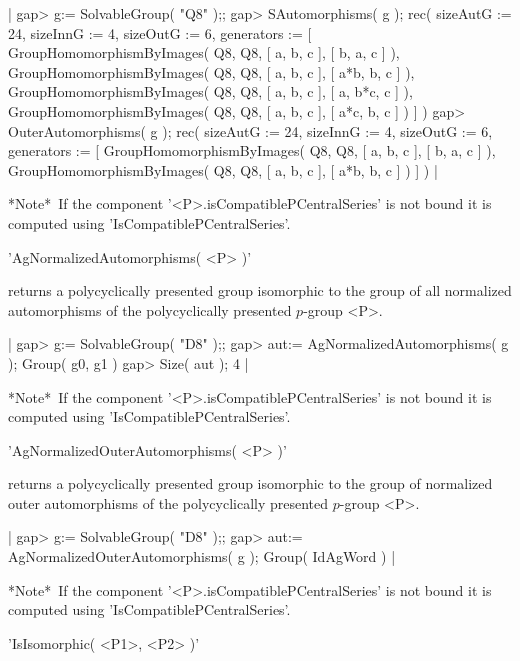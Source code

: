 |    gap> g:= SolvableGroup( "Q8" );;
    gap> SAutomorphisms( g );
    rec(
    sizeAutG := 24,
    sizeInnG := 4,
    sizeOutG := 6,
    generators := 
    [ GroupHomomorphismByImages( Q8, Q8, [ a, b, c ], [ b, a, c ] ), 
      GroupHomomorphismByImages( Q8, Q8, [ a, b, c ], [ a*b, b, c ] ), 
      GroupHomomorphismByImages( Q8, Q8, [ a, b, c ], [ a, b*c, c ] ), 
      GroupHomomorphismByImages( Q8, Q8, [ a, b, c ], [ a*c, b, c ] ) ] )
    gap> OuterAutomorphisms( g );
    rec(
    sizeAutG := 24,
    sizeInnG := 4,
    sizeOutG := 6,
    generators := 
    [ GroupHomomorphismByImages( Q8, Q8, [ a, b, c ], [ b, a, c ] ), 
      GroupHomomorphismByImages( Q8, Q8, [ a, b, c ], [ a*b, b, c ] ) ] ) |

*Note*\:\ If the component '<P>.isCompatiblePCentralSeries' is not bound
it is computed using 'IsCompatiblePCentralSeries'.


'AgNormalizedAutomorphisms( <P> )'

returns a polycyclically presented group isomorphic to the group of
all normalized automorphisms of the polycyclically presented $p$-group <P>.

|    gap> g:= SolvableGroup( "D8" );;
    gap> aut:= AgNormalizedAutomorphisms( g );
    Group( g0, g1 )
    gap> Size( aut );
    4 |

*Note*\:\ If the component '<P>.isCompatiblePCentralSeries' is not bound
it is computed using 'IsCompatiblePCentralSeries'.


'AgNormalizedOuterAutomorphisms( <P> )'

returns a polycyclically presented group isomorphic to the group of
normalized outer automorphisms of the polycyclically presented $p$-group <P>.

|    gap> g:= SolvableGroup( "D8" );;
    gap> aut:= AgNormalizedOuterAutomorphisms( g );
    Group( IdAgWord ) |

*Note*\:\ If the component '<P>.isCompatiblePCentralSeries' is not bound
it is computed using 'IsCompatiblePCentralSeries'.


'IsIsomorphic( <P1>, <P2> )'

